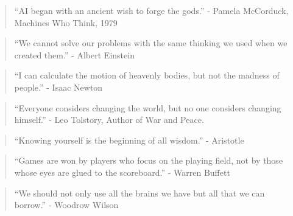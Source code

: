 \begin{quote}
``AI began with an ancient wish to forge the gods.'' - Pamela McCorduck, Machines Who Think, 1979
\end{quote}

\begin{quote}
``We cannot solve our problems with the same thinking we used when we created them.'' - Albert Einstein
\end{quote}

\begin{quote}
	``I can calculate the motion of heavenly bodies, but not the madness of people.'' - Isaac Newton
\end{quote}

\begin{quote}
	``Everyone considers changing the world, but no one considers changing himself.'' - Leo Tolstory, Author of War and Peace.
\end{quote}

\begin{quote}
	``Knowing yourself is the beginning of all wisdom.'' - Aristotle
\end{quote}

\begin{quote}
	``Games are won by players who focus on the playing field, not by those whose eyes are glued to the scoreboard.'' - Warren Buffett
\end{quote} 

\begin{quote}
	``We should not only use all the brains we have but all that we can borrow.'' - Woodrow Wilson
\end{quote}
